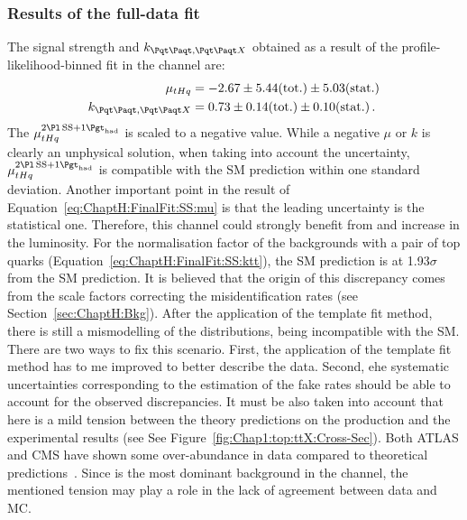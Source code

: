 \subsubsection{Results of the \dilepSStau full-data fit}
\label{sec:ChaptH:Fit:FullFit:SS:results}
The signal strength and $k_{\ttbar,\ttX}$ obtained as a result of the profile-likelihood-binned fit in the \dilepSStau channel are:
\begin{align}
	\mu_{\tHq}		&= -2.67 \pm 5.44 (\text{tot.}) \pm 5.03 (\text{stat.})	\label{eq:ChaptH:FinalFit:SS:mu} \\
	k_{\ttbar,\ttX}		&= 0.73 \pm 0.14 (\text{tot.}) \pm 0.10 (\text{stat.}) 	\label{eq:ChaptH:FinalFit:SS:ktt} \, .
\end{align}
The $\mu^{\dilepSStau}_{\tHq}$ is scaled to a negative value. While a negative $\mu$ or $k$
is clearly an unphysical solution, when taking into account the uncertainty, $\mu^{\dilepSStau}_{\tHq}$ is compatible with the SM prediction within one standard deviation. Another important point in the result of Equation~\ref{eq:ChaptH:FinalFit:SS:mu} is that the leading uncertainty is the statistical one.
 Therefore, this channel could strongly benefit from and increase in the luminosity.
For the normalisation factor of the backgrounds with a pair of top quarks (Equation~\ref{eq:ChaptH:FinalFit:SS:ktt}), the SM prediction is at 1.93$\sigma$ from the SM prediction.
It is believed that the origin of this discrepancy comes from the scale factors correcting the misidentification rates (see
Section~\ref{sec:ChaptH:Bkg}). After the application of the template fit method, there is still a mismodelling of the distributions, being incompatible with the SM. 
There are two ways to fix this scenario. First, the application of the template fit method has to me improved to better describe the data. 
Second, ehe systematic uncertainties corresponding to the estimation of the fake rates should be able to account for the observed discrepancies.
It must be also taken into account that here is a mild tension between the theory predictions on the \ttW production and the experimental results (see See Figure~\ref{fig:Chap1:top:ttX:Cross-Sec}). Both ATLAS and CMS have shown some over-abundance in data compared to theoretical predictions~\cite{ATLAS:2023gon, CMS:2022tkv}. Since \ttW is the most dominant background in the \dilepSStau channel, the mentioned tension may play a role in the lack of agreement between data and  MC.


